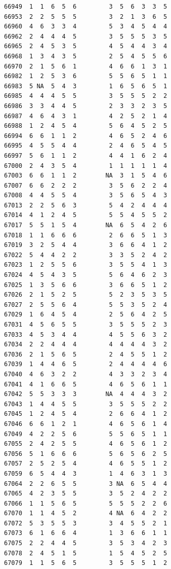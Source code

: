 \documentclass[
  letterpaper,
  DIV=11,
  numbers=noendperiod]{scrreprt}
\begin{document}
\begin{verbatim}
66949  1  1  6  5  6         3  5  6  3  3  5
66953  2  2  5  5  5         3  2  1  3  6  5
66960  4  6  3  3  4         5  3  4  5  4  4
66962  2  4  4  4  5         3  5  5  5  3  5
66965  2  4  5  3  5         4  5  4  4  3  4
66968  1  3  4  3  5         2  5  4  5  5  6
66970  2  1  5  6  1         4  6  6  1  3  1
66982  1  2  5  3  6         5  5  6  5  1  1
66983  5 NA  5  4  3         1  6  5  6  5  1
66985  4  4  4  5  5         3  5  5  5  2  2
66986  3  3  4  4  5         2  3  3  2  3  5
66987  4  6  4  3  1         4  2  5  2  1  4
66988  1  2  4  5  4         5  6  4  5  2  5
66994  6  6  1  1  2         4  6  5  2  4  6
66995  4  5  5  4  4         2  4  6  5  4  5
66997  5  6  1  1  2         4  4  1  6  2  4
67000  2  4  3  5  4         1  1  1  1  1  4
67003  6  6  1  1  2        NA  3  1  5  4  6
67007  6  6  2  2  2         3  5  6  2  2  4
67008  4  4  5  5  4         3  5  6  5  4  3
67013  2  2  5  6  3         5  4  2  4  4  4
67014  4  1  2  4  5         5  5  4  5  5  2
67017  5  5  1  5  4        NA  6  5  4  2  6
67018  1  1  6  6  6         2  6  6  5  1  3
67019  3  2  5  4  4         3  6  6  4  1  2
67022  5  4  4  2  2         3  3  5  2  4  2
67023  1  2  5  5  6         3  5  5  4  1  3
67024  4  5  4  3  5         5  6  4  6  2  3
67025  1  3  5  6  6         3  6  6  5  1  2
67026  2  1  5  2  5         5  2  3  5  3  5
67027  2  5  5  6  4         5  5  3  5  2  4
67029  1  6  4  5  4         2  5  6  4  2  5
67031  4  5  6  5  5         3  5  5  5  2  3
67033  4  5  3  4  4         4  5  5  6  3  2
67034  2  2  4  4  4         4  4  4  4  3  2
67036  2  1  5  6  5         2  4  5  5  1  2
67039  1  4  4  6  5         2  4  4  4  4  6
67040  4  6  3  2  2         4  3  3  2  3  4
67041  4  1  6  6  5         4  6  5  6  1  1
67042  5  5  3  3  3        NA  4  4  4  3  2
67043  1  4  4  5  5         3  5  5  5  2  2
67045  1  2  4  5  4         2  6  6  4  1  2
67046  6  6  1  2  1         4  6  5  6  1  4
67049  4  2  2  5  6         5  5  6  5  1  1
67055  2  4  2  5  5         4  6  5  6  1  2
67056  5  1  6  6  6         5  6  5  6  2  5
67057  2  5  2  5  4         4  6  5  5  1  2
67059  6  5  4  4  3         1  4  6  3  1  3
67064  2  2  6  5  5         3 NA  6  5  4  4
67065  4  2  3  5  5         3  5  2  4  2  2
67066  1  1  5  6  5         5  5  5  2  2  6
67070  1  1  4  5  2         4 NA  6  4  2  2
67072  5  3  5  5  3         3  4  5  5  2  1
67073  6  1  6  6  4         1  3  6  6  1  1
67075  2  2  4  4  5         3  5  3  4  2  3
67078  2  4  5  1  5         1  5  4  5  2  5
67079  1  1  5  6  5         3  5  5  5  1  2

\end{verbatim}
\end{document}
